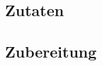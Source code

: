 \documentclass[fontsize=15pt,paper=a4]{scrdoc}
\begin{document}
\section*{}
\vspace{-15pt}
\subsection*{Zutaten}
\begin{multicols}{2}
    \begin{itemize}[left=0pt, label={-}, itemsep=-0.15em]
        
    \end{itemize}
\end{multicols}

\subsection*{Zubereitung}
\begin{enumerate}[left=0pt]
    
\end{enumerate}
\end{document}
